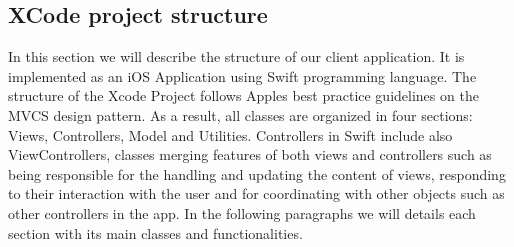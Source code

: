 \documentclass[titlepage]{article}
\begin{document}
	\subsection{XCode project structure}
	In this section we will describe the structure of our client application. It is implemented as an iOS Application using Swift programming language. The structure of the Xcode Project follows Apple\textsc{}s  best practice guidelines on the MVCS design pattern. As a result, all classes are organized in four sections: Views, Controllers, Model and Utilities. Controllers in Swift include also ViewControllers, classes merging features of both views and controllers such as being responsible for the handling and updating the content of views, responding to their interaction with the user and for coordinating with other objects such as other controllers in the app.
	In the following paragraphs we will details each section with its main classes and functionalities.
	
\end{document}

